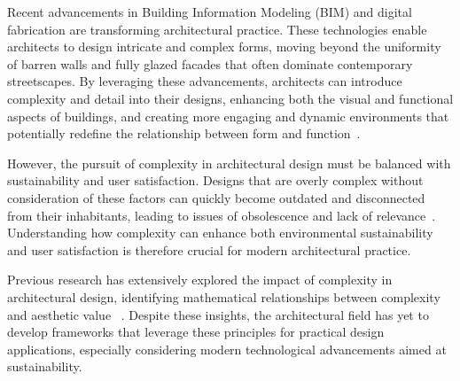 



Recent advancements in Building Information Modeling (BIM) and digital fabrication are transforming architectural practice.
These technologies enable architects to design intricate and complex forms, moving beyond the uniformity of barren walls and fully glazed facades that often dominate contemporary streetscapes.
By leveraging these advancements, architects can introduce complexity and detail into their designs, enhancing both the visual and functional aspects of buildings, and creating more engaging and dynamic environments that potentially redefine the relationship between form and function~\cite{Leach2016}.

However, the pursuit of complexity in architectural design must be balanced with sustainability and user satisfaction.
Designs that are overly complex without consideration of these factors can quickly become outdated and disconnected from their inhabitants, leading to issues of obsolescence and lack of relevance~\cite{Oberfrancova2021}.
Understanding how complexity can enhance both environmental sustainability and user satisfaction is therefore crucial for modern architectural practice.

Previous research has extensively explored the impact of complexity in architectural design, identifying mathematical relationships between complexity and aesthetic value ~\cite{Bies2016, Douchova2016, Redies2015}.
Despite these insights, the architectural field has yet to develop frameworks that leverage these principles for practical design applications, especially considering modern technological advancements aimed at sustainability.

